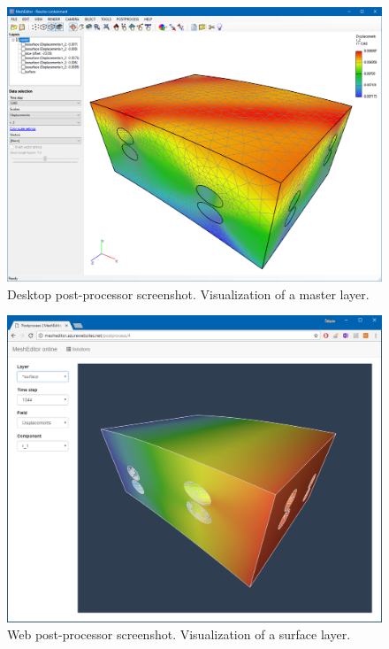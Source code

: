 \begin{figure}[H]
    \centering
    \includegraphics[width=\textwidth]{figures/chapter-data-management/desktop-post-processor-master}
    \decoRule
    \caption{Desktop post-processor screenshot. Visualization of a master layer.}
    \label{fig:desktop-post-processor-master}
\end{figure}

\begin{figure}[H]
    \centering
    \includegraphics[width=\textwidth]{figures/chapter-data-management/web-post-processor-surface}
    \decoRule
    \caption{Web post-processor screenshot. Visualization of a surface layer.}
    \label{fig:web-post-processor-surface}
\end{figure}




